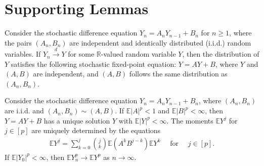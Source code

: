 
\section{Supporting Lemmas}

\begin{lemma}
\label{characterize_solution} Consider the stochastic difference equation $Y_n = A_n Y_{n-1} + B_n$ for $n \geq 1$, where the pairs $(A_n, B_n)$ are independent and identically distributed (i.i.d.) random variables. If $Y_n \xrightarrow{d} Y$ for some $\mathbb{R}$-valued random variable $Y$, then the distribution of $Y$ satisfies the following stochastic fixed-point equation: $Y = A Y + B$, where $Y$ and $(A, B)$ are independent, and $(A, B)$ follows the same distribution as $(A_n, B_n)$.
\end{lemma}


\begin{lemma}
\label{converge_moment_theorem_vervaat}
Consider the stochastic difference equation $Y_n = A_n Y_{n-1}+B_n$, where $(A_n, B_n)$ are i.i.d. and $(A_n, B_n) \sim (A,B)$. If $\mathbb{E} |A|^p<1$ and $\mathbb{E}|B|^p < \infty$, then $Y=AY+B$ has a unique solution $Y$ with $\mathbb{E}|Y|^p<\infty$. The moments $\mathbb{E}Y^j$ for $j \in [p]$ are uniquely determined by the equations
\begin{align*}
\mathbb{E} Y^j=\sum_{k=0}^j\binom{j}{k} \mathbb{E}\left(A^k B^{j-k}\right) \mathbb{E} Y^k \quad \text { for } \quad j \in [p].
\end{align*}
If $\mathbb{E} |Y_0|^p <\infty$, then $\mathbb{E}Y_n^p \to \mathbb{E}Y^p$ as $n \to \infty$.
\end{lemma}

